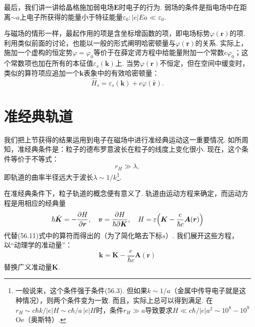 最后，我们讲一讲给晶格施加弱电场$\bm E$时电子的行为. 弱场的条件是指电场中在距离$\sim a$上电子所获得的能量小于特征能量$\varepsilon_0:|e|Ea\ll\varepsilon_0$.

与磁场的情形一样，最起作用的项是含坐标增函数的项，即电场标势$\varphi(\bm r)$的项. 利用类似前面的讨论，也能以一般的形式阐明哈密顿量与$\varphi(\bm r)$的关系. 实际上，施加一个虚构的恒定势$\varphi=\varphi_0$等价于在薛定谔方程中给能量附加一个常数$e\varphi_0$；这个常数项也加在所有的本征值$\varepsilon_s(\bm k)$上. 当势$\varphi(\bm r)$不恒定，但在空间中缓变时，类似的算符项应追加一个$\bm k$表象中的有效哈密顿量：
\begin{equation}
\hat H_s=\varepsilon_s(\bm k)+e\varphi(\hat{\bm r}).
\label{56.13}
\end{equation}

\section{准经典轨道}

我们把上节获得的结果运用到电子在磁场中进行准经典运动这一重要情况. 如所周知，准经典条件是：粒子的德布罗意波长在粒子的线度上变化很小. 现在，这个条件等价于不等式：
\begin{equation}
r_H\gg\lambda,
\label{57.1}
\end{equation}
即轨道的曲率半径远大于波长$\lambda\sim1/k$\footnote{一般说来，这个条件强于条件(56.3). 但如果$k\sim1/a$（金属中传导电子就是这种情况），则两个条件变为一致. 而且，实际上总可以得到满足. 在$r_H\sim c\hbar k/|e|H\sim c\hbar/a\,|e|H$时，条件$r_H\gg a$导致要求$H\ll c\hbar/|e|a^2\sim10^8-10^9\,$Oe（奥斯特）.}.

在准经典条件下，粒子轨道的概念便有意义了. 轨道由运动方程来确定，而运动方程是用相应的经典量
\begin{equation*}
\hbar\dot{\bm K}=-\frac{\partial H}{\partial\bm r},\quad
\bm v=\frac{\partial H}{\hbar\partial\bm K},\quad
H=\varepsilon\Bigl(\bm K-\frac{e}{\hbar c}\bm A(\bm r)\Bigr)
\end{equation*}
代替(56.11)式中的算符而得出的（为了简化略去下标$s$）. 我们展开这些方程，以“动理学的准动量”：
\begin{equation*}
\bm k=\bm K-\frac{e}{\hbar c}\bm A(\bm r)
\end{equation*}
替换广义准动量$\bm K$.

